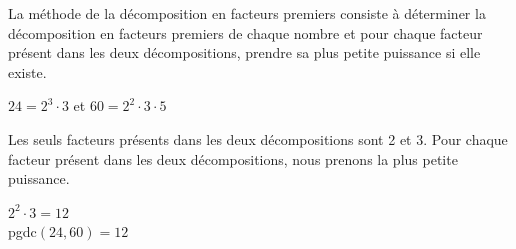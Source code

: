 \vspace{20pt}
La \textcolor{themeNO}{méthode de la décomposition en facteurs premiers} consiste à déterminer la décomposition en facteurs premiers de chaque nombre et pour chaque facteur présent dans les deux décompositions, prendre sa plus petite puissance si elle existe.

$24=2^3\cdot 3$ \quad\quad et \quad\quad $60=2^{2}\cdot 3\cdot 5$

Les seuls facteurs présents dans les deux décompositions sont 2 et 3. Pour chaque facteur présent dans les deux décompositions, nous prenons la plus petite puissance.

$2^2\cdot 3=12$\\
pgdc$(24,60) =12$


\newpage
{}

 
